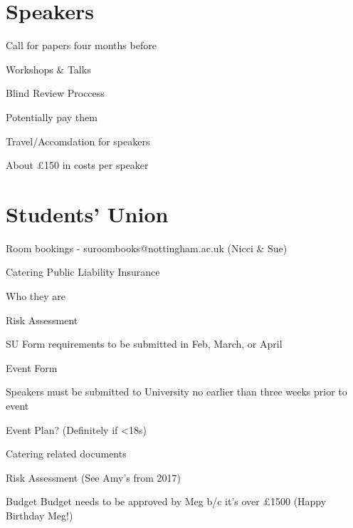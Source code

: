 \documentclass[11pt,hacksoc]{meetingmins}
\begin{document}
\section{Speakers}
\begin{items}
\item
Call for papers four months before

	\subitem
	Workshops \& Talks
	
	\subitem
	Blind Review Proccess

\item
Potentially pay them

\item
Travel/Accomdation for speakers

\item
About \pounds150 in costs per speaker
	
\end{items}

\section{Students' Union}
\begin{items}

\item
Room bookings - suroombooks@nottingham.ac.uk (Nicci \& Sue)
	\subitem

\item
Catering
	\subitem
	Public Liability Insurance
	
	\subitem
	Who they are
	
	\subitem
	Risk Assessment
	

\item
SU Form requirements to be submitted in Feb, March, or April


\item
Event Form
	\subitem
	
	\subitem
	Speakers must be submitted to University no earlier than three weeks prior to event
	
\item
Event Plan? (Definitely if <18s)
	
\item
Catering related documents
	
\item
Risk Assessment (See Amy's from 2017)
	\subitem
		
\item
Budget
	\subitem
	Budget needs to be approved by Meg b/c it's over \pounds1500 (Happy Birthday Meg!)

	\subitem
	
	\subitem

\end{items}

\vspace{1em}
\end{document}
